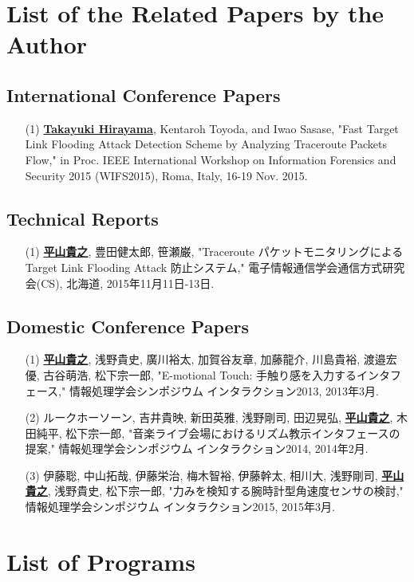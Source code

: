 \newpage
\appendix
\chapter{List of the Related Papers by the Author}

\section{International Conference Papers}
\begin{itemize}
  \item[(1)]
    {\bf \underline{Takayuki Hirayama}}, Kentaroh Toyoda, and Iwao Sasase,
    "Fast Target Link Flooding Attack Detection Scheme by Analyzing Traceroute Packets Flow,"
    in Proc. IEEE International Workshop on Information Forensics and Security 2015 (WIFS2015), Roma, Italy, 16-19 Nov. 2015.
\end{itemize}

\section{Technical Reports}
\begin{itemize}
  \item[(1)]
    {\bf \underline{平山貴之}}, 豊田健太郎, 笹瀬巌,
    "Traceroute パケットモニタリングによる Target Link Flooding Attack 防止システム,"
    電子情報通信学会通信方式研究会(CS), 北海道, 2015年11月11日-13日.
\end{itemize}


\section{Domestic Conference Papers}
\begin{itemize}
\item[(1)]
{\bf \underline{平山貴之}}, 浅野貴史, 廣川裕太, 加賀谷友章, 加藤龍介, 川島貴裕, 渡邉宏優, 古谷萌浩, 松下宗一郎, "E-motional Touch: 手触り感を入力するインタフェース,"
情報処理学会シンポジウム インタラクション2013, 2013年3月.
\item[(2)]
ルークホーソーン, 吉井貴映, 新田英雅, 浅野剛司, 田辺晃弘, {\bf \underline{平山貴之}}, 木田純平, 松下宗一郎, "音楽ライブ会場におけるリズム教示インタフェースの提案,"
情報処理学会シンポジウム インタラクション2014, 2014年2月.
\item[(3)]
伊藤聡, 中山拓哉, 伊藤栄治, 梅木智裕, 伊藤幹太, 相川大, 浅野剛司, {\bf \underline{平山貴之}}, 浅野貴史, 松下宗一郎, "力みを検知する腕時計型角速度センサの検討,"
情報処理学会シンポジウム インタラクション2015, 2015年3月.
\end{itemize}

\chapter{List of Programs}
